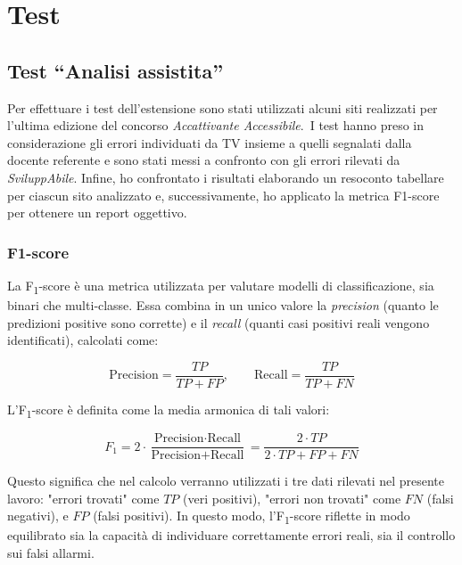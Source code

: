 \hypersetup{linkcolor=emerald}

\chapter{Test}
\label{chap:test}

\section{Test ``Analisi assistita''}
\noindent Per effettuare i test dell’estensione sono stati utilizzati alcuni siti realizzati per l’ultima edizione del concorso \textit{Accattivante Accessibile}.\
I test hanno preso in considerazione gli errori individuati da TV insieme a quelli segnalati dalla docente referente e sono stati messi a confronto con gli errori rilevati da \textit{SviluppAbile}.
Infine, ho confrontato i risultati elaborando un resoconto tabellare per ciascun sito analizzato e, successivamente, ho applicato la metrica F1-score per ottenere un report oggettivo.

\subsection{F1-score}
\noindent La F\textsubscript{1}-score è una metrica utilizzata per valutare modelli di classificazione, sia binari che multi‐classe. Essa combina in un unico valore la \textit{precision} (quanto le predizioni positive sono corrette) e il \textit{recall} (quanti casi positivi reali vengono identificati), calcolati come:

\[
\text{Precision} = \frac{TP}{TP + FP}, 
\qquad
\text{Recall} = \frac{TP}{TP + FN}
\]

\vspace{0.5cm}
\noindent L’F\textsubscript{1}-score è definita come la media armonica di tali valori:

\[
F_{1} = 2 \cdot \frac{\text{Precision} \cdot \text{Recall}}{\text{Precision} + \text{Recall}}
 = \frac{2 \cdot TP}{2 \cdot TP + FP + FN}
\]
\vspace{0.1cm}

\noindent Questo significa che nel calcolo verranno utilizzati i tre dati rilevati nel presente lavoro:
"errori trovati" come \(TP\) (veri positivi), "errori non trovati" come \(FN\) (falsi negativi), e \(FP\) (falsi positivi).
In questo modo, l’F\textsubscript{1}-score riflette in modo equilibrato sia la capacità di individuare correttamente errori reali, sia il controllo sui falsi allarmi.\\

